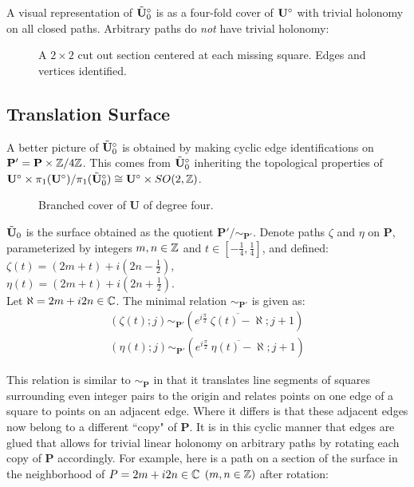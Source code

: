 \documentclass[]{article}
\def\btUos{\btU_0^\circ}
\begin{document}
A visual representation of $\btUos$ is as a four-fold cover of $\mathbf{U}^\circ$ with trivial holonomy on all closed paths. Arbitrary paths do \emph{not} have trivial holonomy:



\begin{figure}[H]
\centering

\caption{A $2\times2$ cut out section centered at each missing square. Edges and vertices identified.}
\label{fig:quotient}
\end{figure}

\subsection{Translation Surface}

A better picture of $\btUos$ is obtained by making cyclic edge identifications on $\mathbf{P'}=\mathbf{P}\times\mathbb{Z}/4\mathbb{Z}$. This comes from $\btUos$ inheriting the topological properties of $\bUs\times \pi_1(\bUs)/\pi_1(\btUos)\cong \bUs\times SO(2,\ZZ)$.


\begin{figure}[H]
\centering

\label{fig:utilda0}
\caption{Branched cover of $\mathbf{U}$ of degree four.}
\end{figure}

\begin{Def}
$\tilde{\mathbf{U}}_0$ is the surface obtained as the quotient $\mathbf{P}'/\sim_{\mathbf{P}'}$. Denote paths $\zeta$ and $\eta$  on $\mathbf{P}$, parameterized by integers $m,n\in\mathbb{Z}$ and $t\in[-\frac{1}{4},\frac{1}{4}]$, and defined:\\ $\zeta(t)=(2m+t)+i(2n-\frac{1}{2})$,\\
$\eta(t)=(2m+t)+i(2n+\frac{1}{2})$.\\ Let $\aleph=2m+i2n\in\mathbb{C}$. The minimal relation $\sim_{\mathbf{P}'}$ is given as:
\begin{equation}
\begin{split}
(\zeta(t);j)\sim_{\mathbf{P'}}(e^{i\frac{\pi}{2}}~\overline{\zeta(t)-\aleph};j+1)\\
(\eta(t);j)\sim_{\mathbf{P'}}(e^{i\frac{\pi}{2}}~\overline{\eta(t)-\aleph};j+1)
\label{eq:rel2}
\end{split}
\end{equation}
\end{Def}
This relation is similar to $\sim_\mathbf{P}$ in that it translates line segments of squares surrounding even integer pairs to the origin and relates points on one edge of a square to points on an adjacent edge. Where it differs is that these adjacent edges now belong to a different ``copy" of $\mathbf{P}$. It is in this cyclic manner that edges are glued that allows for trivial linear holonomy on arbitrary paths by rotating each copy of $\mathbf{P}$ accordingly. For example, here is a path on a section of the surface in the neighborhood of $P=2m+i2n\in\mathbb{C}$ $(m,n\in\mathbb{Z})$ after rotation:
\end{document}
